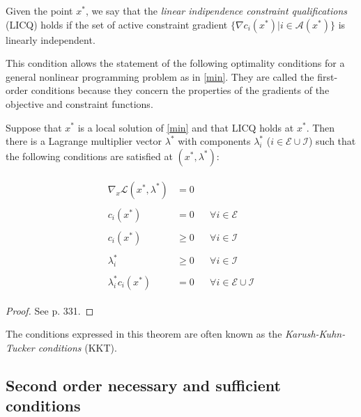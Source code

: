 \begin{defi}
Given the point $x^*$, we say that the \emph{linear indipendence constraint qualifications} (LICQ) holds if the set of active constraint gradient $\{ \nabla c_i (x^*)| i \in \mathcal{A}(x^*)\}$ is linearly independent.
\end{defi}

This condition allows the statement of the following optimality conditions for a general nonlinear programming problem as in \eqref{min}. They are called the first-order conditions because they concern the properties of the gradients of the objective and constraint functions.

\begin{theorem}

Suppose that $x^*$ is a local solution of \eqref{min} and that LICQ holds at $x^*$. Then there is a Lagrange multiplier vector $\lambda^*$ with components $\lambda_i^*$ ($i \in \mathcal{E}\cup \mathcal{I}$) such that the following conditions are satisfied at $(x^*,\lambda^*)$:

\begin{align}
\label{KKT}
\begin{aligned}
\nabla_x \mathcal{L}(x^*,\lambda^*) &= 0  && \\
\\
c_i (x^*) &= 0 && \forall i \in \mathcal{E} \\
\\
c_i (x^*) &\geq 0 && \forall i \in \mathcal{I} \\
\\
\lambda_i^* &\geq 0 && \forall i \in \mathcal{I} \\
\\
\lambda_i^* c_i (x^*) &= 0 && \forall i \in \mathcal{E} \cup \mathcal{I}
\end{aligned}
\end{align}
\begin{proof}
See \citep{nocedal} p. 331.
\end{proof}
\end{theorem}

The conditions expressed in this theorem are often known as the \emph{Karush-Kuhn-Tucker conditions} (KKT).

\subsection{Second order necessary and sufficient conditions}

